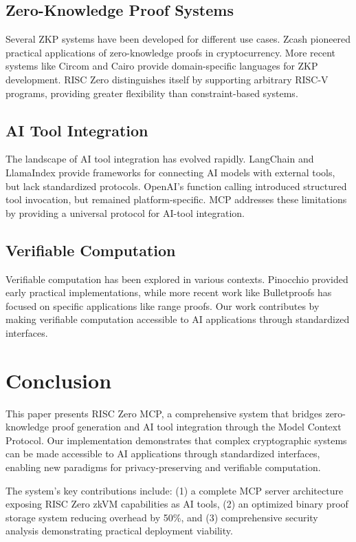 \documentclass[11pt]{article}
\begin{document}
\subsection{Zero-Knowledge Proof Systems}

Several ZKP systems have been developed for different use cases. Zcash pioneered practical applications of zero-knowledge proofs in cryptocurrency. More recent systems like Circom and Cairo provide domain-specific languages for ZKP development. RISC Zero distinguishes itself by supporting arbitrary RISC-V programs, providing greater flexibility than constraint-based systems.

\subsection{AI Tool Integration}

The landscape of AI tool integration has evolved rapidly. LangChain and LlamaIndex provide frameworks for connecting AI models with external tools, but lack standardized protocols. OpenAI's function calling introduced structured tool invocation, but remained platform-specific. MCP addresses these limitations by providing a universal protocol for AI-tool integration.

\subsection{Verifiable Computation}

Verifiable computation has been explored in various contexts. Pinocchio provided early practical implementations, while more recent work like Bulletproofs has focused on specific applications like range proofs. Our work contributes by making verifiable computation accessible to AI applications through standardized interfaces.


\section{Conclusion}
\label{sec:conclusion}

This paper presents RISC Zero MCP, a comprehensive system that bridges zero-knowledge proof generation and AI tool integration through the Model Context Protocol. Our implementation demonstrates that complex cryptographic systems can be made accessible to AI applications through standardized interfaces, enabling new paradigms for privacy-preserving and verifiable computation.

The system's key contributions include: (1) a complete MCP server architecture exposing RISC Zero zkVM capabilities as AI tools, (2) an optimized binary proof storage system reducing overhead by 50\%, and (3) comprehensive security analysis demonstrating practical deployment viability.
\end{document}
